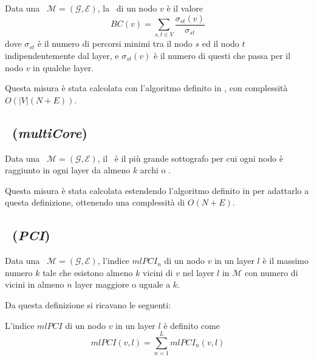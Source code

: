 \begin{definizione}[\verBetweennessCentrality]
    Data una \muln\ $\mathcal{M}=(\mathcal{G}, \mathcal{E})$, la 
    \verBetweennessCentrality\ di un nodo $v$ è il valore 
    \begin{equation}
        BC(v) = \sum_{s, t \in V} \frac{\sigma_{st}(v)}{\sigma_{st}}
    \end{equation}
    dove $\sigma_{st}$ è il numero di percorsi minimi tra il nodo $s$ ed il nodo $t$
    indipendentemente dal layer, e $\sigma_{st}(v)$ è il numero di questi che passa 
    per il nodo $v$ in qualche layer.
\end{definizione}

Questa misura è stata calcolata con l'algoritmo definito in \cite{dedomenico:verbetw}, 
con complessità $O\left(|V|\left(N+E\right)\right)$.

\subsection{\multiCore~(\textit{multiCore})}

\begin{definizione}[\multiCore]
    Data una \muln\ $\mathcal{M}=(\mathcal{G}, \mathcal{E})$, il \multiCore\ è
    il più grande sottografo per cui ogni nodo è raggiunto in ogni layer da almeno $k$ archi o
    \interc.
\end{definizione}

Questa misura è stata calcolata estendendo l'algoritmo definito in \cite{batagelj:kcore} per 
adattarlo a questa definizione, ottenendo una complessità di $O(N + E)$.

\subsection{\PCI~(\textit{PCI})}
\begin{definizione}
    Data una \muln\ $\mathcal{M}=(\mathcal{G}, \mathcal{E})$, 
    l'indice $mlPCI_n$ di un nodo $v$ in un layer $l$ 
    è il massimo numero $k$ tale che esistono almeno $k$ vicini di $v$ nel layer $l$ in $\mathcal{M}$
    con numero di vicini in almeno $n$ layer maggiore o uguale a $k$.
\end{definizione}

Da questa definizione si ricavano le seguenti:

\begin{definizione}[\mlPCI]
    L'indice $mlPCI$ di un nodo $v$ in un layer $l$ è definito come 
    \begin{equation}
        mlPCI(v, l) = \sum_{n=1}^L mlPCI_n(v, l)
    \end{equation}
\end{definizione}

